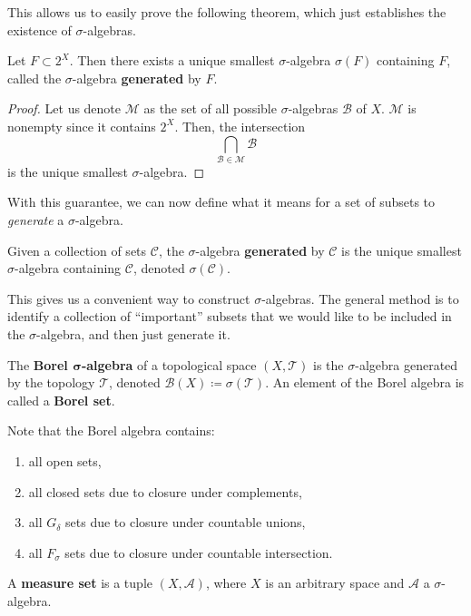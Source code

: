   This allows us to easily prove the following theorem, which just establishes the existence of $\sigma$-algebras. 

  \begin{theorem}
    Let $F \subset 2^X$. Then there exists a unique smallest $\sigma$-algebra $\sigma(F)$ containing $F$, called the $\sigma$-algebra \textbf{generated} by $F$. 
  \end{theorem}
  \begin{proof}
    Let us denote $\mathcal{M}$ as the set of all possible $\sigma$-algebras $\mathcal{B}$ of $X$. $\mathcal{M}$ is nonempty since it contains $2^X$. Then, the intersection 
    \begin{equation}
      \bigcap_{\mathcal{B} \in \mathcal{M}} \mathcal{B}
    \end{equation}
    is the unique smallest $\sigma$-algebra. 
  \end{proof} 

  With this guarantee, we can now define what it means for a set of subsets to \textit{generate} a $\sigma$-algebra. 

  \begin{definition}
    Given a collection of sets $\mathscr{C}$, the $\sigma$-algebra \textbf{generated} by $\mathscr{C}$ is the unique smallest $\sigma$-algebra containing $\mathscr{C}$, denoted $\sigma(\mathscr{C})$. 
  \end{definition} 

  This gives us a convenient way to construct $\sigma$-algebras. The general method is to identify a collection of ``important'' subsets that we would like to be included in the $\sigma$-algebra, and then just generate it.   

  \begin{definition}
    The \textbf{Borel $\boldsymbol{\sigma}$-algebra} of a topological space $(X, \mathscr{T})$ is the $\sigma$-algebra generated by the topology $\mathscr{T}$, denoted $\mathcal{B}(X) \coloneqq \sigma(\mathscr{T})$. An element of the Borel algebra is called a \textbf{Borel set}. 
  \end{definition}

  Note that the Borel algebra contains: 
  \begin{enumerate}
    \item all open sets, 
    \item all closed sets due to closure under complements, 
    \item all $G_\delta$ sets due to closure under countable unions, 
    \item all $F_\sigma$ sets due to closure under countable intersection. 
  \end{enumerate}

  \begin{definition}
    A \textbf{measure set} is a tuple $(X, \mathcal{A})$, where $X$ is an arbitrary space and $\mathcal{A}$ a $\sigma$-algebra. 
  \end{definition}
